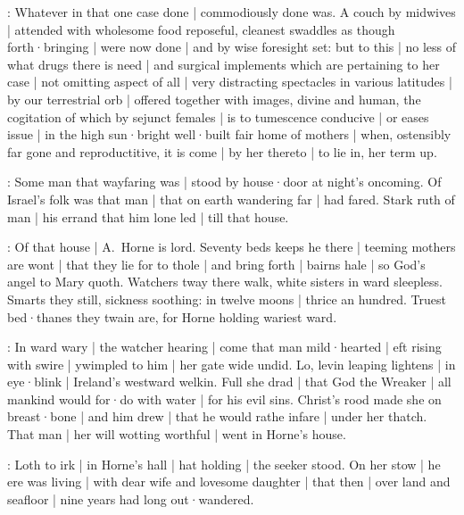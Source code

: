 :
Whatever in that one case done |
commodiously done was.
A couch by midwives |
attended with wholesome food reposeful,
cleanest swaddles as though forth·bringing |
were now done |
and by wise foresight set:
but to this |
no less of what drugs there is need |
and surgical implements which are pertaining to her case |
not omitting aspect of all |
very distracting spectacles in various latitudes |
by our terrestrial orb |
offered together with images,
divine and human,
the cogitation of which by sejunct females |
is to tumescence conducive |
or eases issue |
in the high sun·bright well·built fair home of mothers |
when,
ostensibly far gone and reproductitive,
it is come |
by her thereto |
to lie in,
her term up.



:
Some man that wayfaring was |
stood by house·door at night's oncoming.
Of Israel's folk was that man |
that on earth wandering far |
had fared.
Stark ruth of man |
his errand that him lone led |
till that house.


:
Of that house |
A.~Horne is lord.
Seventy beds keeps he there |
teeming mothers are wont |
that they lie for to thole |
and bring forth |
bairns hale |
so God's angel to Mary quoth.
Watchers tway there walk,
white sisters in ward sleepless.
Smarts they still,
sickness soothing:
in twelve moons |
thrice an hundred.
Truest bed·thanes they twain are,
for Horne holding wariest ward.


:
In ward wary |
the watcher hearing |
come that man mild·hearted |
eft rising with swire |
ywimpled to him |
her gate wide undid.
Lo,
levin leaping lightens |
in eye·blink |
Ireland's westward welkin.
Full she drad |
that God the Wreaker |
all mankind would for·do with water |
for his evil sins.
Christ's rood made she on breast·bone |
and him drew |
that he would rathe infare |
under her thatch.
That man |
her will wotting worthful |
went in Horne's house.



:
Loth to irk |
in Horne's hall |
hat holding |
the seeker stood.
On her stow |
he ere was living |
with dear wife and lovesome daughter |
that then |
over land and seafloor |
nine years had long out·wandered.


